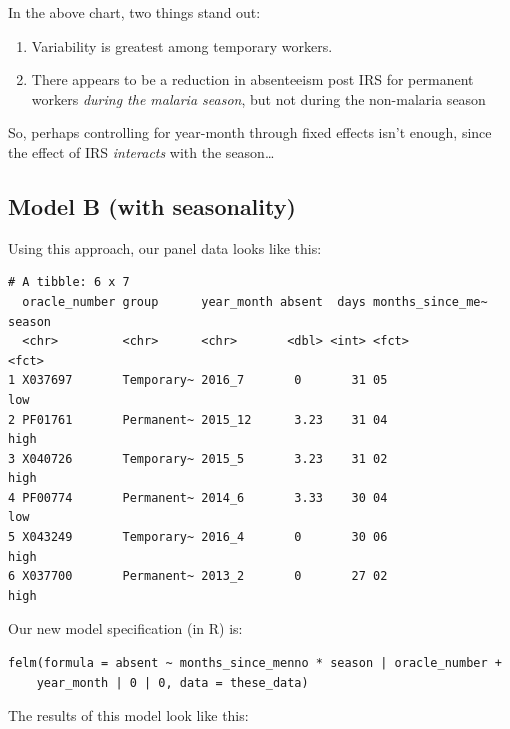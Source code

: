 \documentclass[]{article}
\providecommand{\tightlist}{%
  \setlength{\itemsep}{0pt}\setlength{\parskip}{0pt}}
\begin{document}
In the above chart, two things stand out:

\begin{enumerate}
\def\labelenumi{\arabic{enumi}.}
\tightlist
\item
  Variability is greatest among temporary workers.
\item
  There appears to be a reduction in absenteeism post IRS for permanent
  workers \emph{during the malaria season}, but not during the
  non-malaria season
\end{enumerate}

So, perhaps controlling for year-month through fixed effects isn't
enough, since the effect of IRS \emph{interacts} with the season\ldots{}

\subsection{Model B (with seasonality)}\label{model-b-with-seasonality}

Using this approach, our panel data looks like this:

\begin{verbatim}
# A tibble: 6 x 7
  oracle_number group      year_month absent  days months_since_me~ season
  <chr>         <chr>      <chr>       <dbl> <int> <fct>            <fct> 
1 X037697       Temporary~ 2016_7       0       31 05               low   
2 PF01761       Permanent~ 2015_12      3.23    31 04               high  
3 X040726       Temporary~ 2015_5       3.23    31 02               high  
4 PF00774       Permanent~ 2014_6       3.33    30 04               low   
5 X043249       Temporary~ 2016_4       0       30 06               high  
6 X037700       Permanent~ 2013_2       0       27 02               high  
\end{verbatim}

Our new model specification (in R) is:

\begin{verbatim}
felm(formula = absent ~ months_since_menno * season | oracle_number + 
    year_month | 0 | 0, data = these_data)
\end{verbatim}

The results of this model look like this:
\end{document}
